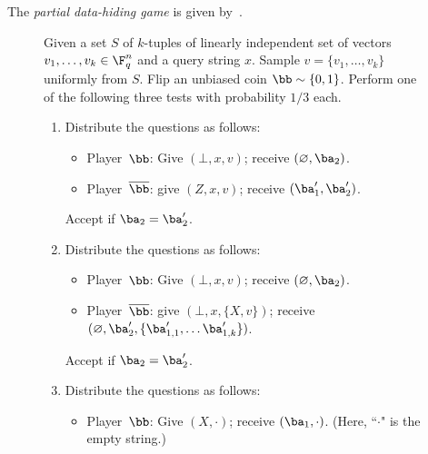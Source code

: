 \documentclass[11pt]{article}
\newcommand{\ainnote}[1]{{\bf \color{blue}(Anand: {#1})}}
\begin{document}


\begin{definition}\label{def:data-hide-def}
The \emph{partial data-hiding game} is given by~.
\end{definition}

{
\begin{figure}[htpb]
  Given a set $S$ of $k$-tuples of linearly independent set of vectors $v_1, \dots, v_k \in
  \F_q^{n}$ and a query string $x$. Sample $v = \{v_1, \dots, v_k\}$ uniformly from $S$.
  Flip an unbiased coin $\bb \sim \{0, 1\}$. Perform one of the following three tests with
  probability $1/3$ each.
  \begin{enumerate}
    \item Distribute the questions as follows:
      \begin{itemize}
      \item[$\circ$] Player~$\bb$: Give $(\bot, x,v)$; receive $(\varnothing, \ba_2)$.
      \item[$\circ$] Player~$\overline{\bb}$: give $(Z, x,v)$; receive
        $(\ba'_1, \ba'_2)$.
      \end{itemize}
      Accept if $\ba_2 = \ba_2'$.
    \item Distribute the questions as follows:
      \begin{itemize}
        \item[$\circ$] Player~$\bb$: Give $(\bot, x,v)$; receive $(\varnothing, \ba_2)$.
        \item[$\circ$] Player~$\overline{\bb}$: give $(\bot, x, \{X, v\})$; receive
        $(\varnothing, \ba'_2, \{\ba_{1,1}', \dots \ba_{1,k}'\})$. 
        \end{itemize}
        Accept if $\ba_2 = \ba_2'$.
      \item Distribute the questions as follows:
        \begin{itemize}
        \item[$\circ$] Player~$\bb$: Give $(X, \cdot)$; receive $(\ba_1, \cdot)$. (Here, ``$\cdot$" is the empty string.)

\end{itemize}
\end{enumerate}
\end{figure}}
\end{document}

